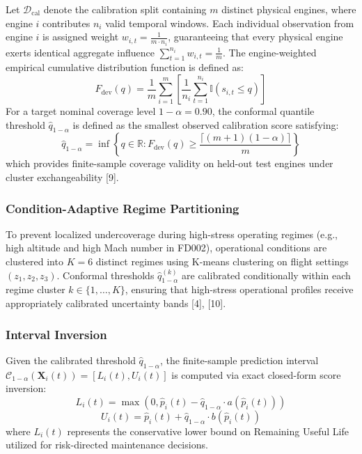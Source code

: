 \documentclass[12pt,a4paper]{article}
\begin{document}
Let $\mathcal{D}_{\text{cal}}$ denote the calibration split containing $m$ distinct physical engines, where engine $i$ contributes $n_i$ valid temporal windows. Each individual observation from engine $i$ is assigned weight $w_{i,t} = \frac{1}{m \cdot n_i}$, guaranteeing that every physical engine exerts identical aggregate influence $\sum_{t=1}^{n_i} w_{i,t} = \frac{1}{m}$. The engine-weighted empirical cumulative distribution function is defined as:
\begin{equation}
F_{\text{dev}}(q) = \frac{1}{m} \sum_{i=1}^m \left[ \frac{1}{n_i} \sum_{t=1}^{n_i} \mathbb{I}(s_{i,t} \le q) \right]
\end{equation}
For a target nominal coverage level $1 - \alpha = 0.90$, the conformal quantile threshold $\hat{q}_{1-\alpha}$ is defined as the smallest observed calibration score satisfying:
\begin{equation}
\hat{q}_{1-\alpha} = \inf \left\{ q \in \mathbb{R} : F_{\text{dev}}(q) \ge \frac{\lceil (m + 1)(1 - \alpha) \rceil}{m} \right\}
\end{equation}
which provides finite-sample coverage validity on held-out test engines under cluster exchangeability [9].

\subsubsection*{Condition-Adaptive Regime Partitioning}
To prevent localized undercoverage during high-stress operating regimes (e.g., high altitude and high Mach number in FD002), operational conditions are clustered into $K = 6$ distinct regimes using K-means clustering on flight settings $(z_1, z_2, z_3)$. Conformal thresholds $\hat{q}_{1-\alpha}^{(k)}$ are calibrated conditionally within each regime cluster $k \in \{1, \dots, K\}$, ensuring that high-stress operational profiles receive appropriately calibrated uncertainty bands [4], [10].

\subsubsection*{Interval Inversion}
Given the calibrated threshold $\hat{q}_{1-\alpha}$, the finite-sample prediction interval $\mathcal{C}_{1-\alpha}(\mathbf{X}_i(t)) = [L_i(t), U_i(t)]$ is computed via exact closed-form score inversion:
\begin{equation}
L_i(t) = \max(0, \hat{p}_i(t) - \hat{q}_{1-\alpha} \cdot a(\hat{p}_i(t)))
\end{equation}
\begin{equation}
U_i(t) = \hat{p}_i(t) + \hat{q}_{1-\alpha} \cdot b(\hat{p}_i(t))
\end{equation}
where $L_i(t)$ represents the conservative lower bound on Remaining Useful Life utilized for risk-directed maintenance decisions.
\end{document}
